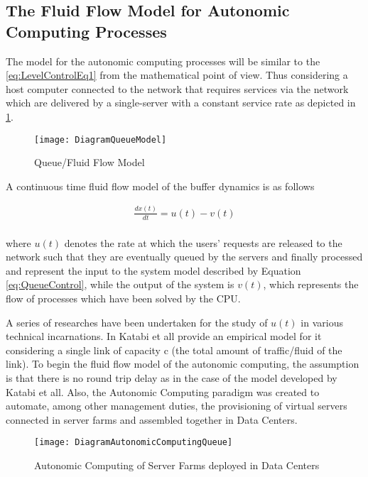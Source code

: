 \subsection{The Fluid Flow Model for Autonomic Computing Processes}

The model for the autonomic computing processes will be similar to the \ref{eq:LevelControlEq1} from the mathematical point of view. Thus considering a host computer connected to the network that requires services via the network which are delivered by a single-server with a constant service rate as depicted in \ref{fig:QueueLengthControl}.

\begin{figure}[htb!]
\texttt{[image: DiagramQueueModel]}
\caption{Queue/Fluid Flow Model}
\label{fig:QueueLengthControl}
\end{figure}

A continuous time fluid flow model of the buffer dynamics is as follows

\begin{equation}
\begin{array}{l}
\frac{dx(t)}{dt} = u(t) -v(t) \\
\end{array}
 \label{eq:QueueControl}
\end{equation}

where $u(t)$ denotes the rate at which the users' requests are released to the network such that they are eventually queued by the servers and finally processed and represent the input to the system model described by Equation \ref{eq:QueueControl}, while the output of the system is $v(t)$, which represents the flow of processes which have been solved by the CPU.

A series of researches have been undertaken for the study of $u(t)$ in various technical incarnations. In \cite{model:queueKatabi} Katabi et all provide an empirical model for it considering a single link of capacity c (the total amount of traffic/fluid of the link). To begin the fluid flow model of the autonomic computing, the assumption is that there is no round trip delay as in the case of the model developed by Katabi et all.
Also, the Autonomic Computing paradigm was created to automate, among other management duties, the provisioning of virtual servers connected in server farms and assembled together in Data Centers. 

\begin{figure}[htb!]
\texttt{[image: DiagramAutonomicComputingQueue]}
\caption{Autonomic Computing of Server Farms deployed in Data Centers}
\label{fig:QueueAutonomicComputing}
\end{figure}

